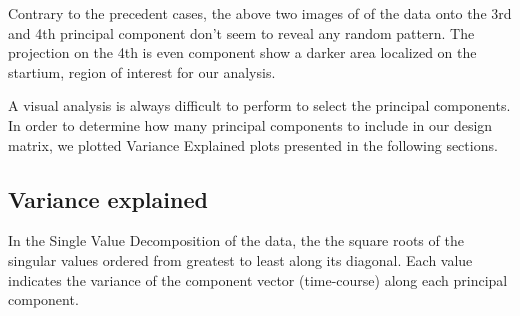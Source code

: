 \noindent
\par Contrary to the precedent cases, the above two images of of the data onto the 3rd 
and 4th principal component don't seem to reveal any random pattern. The projection on 
the 4th is even component show a darker area localized on the startium, region of interest
for our analysis.

\par A visual analysis is always difficult to perform to select the principal components. 
In order to determine how many principal components to include in our design matrix,
we plotted Variance Explained plots presented in the following sections.

\subsection{Variance explained} 
\noindent
\par In the Single Value Decomposition of the data, the the square roots of the 
singular values ordered from greatest to least along its diagonal. Each value 
indicates the variance of the component vector (time-course) along each principal component. 

